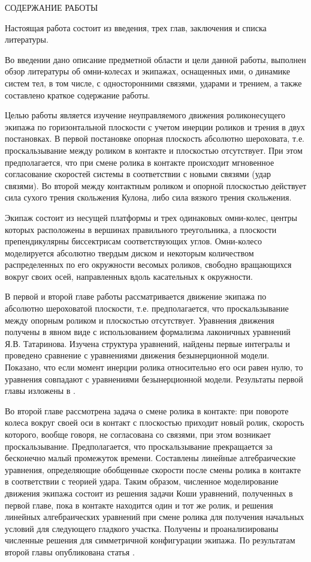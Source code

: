 
СОДЕРЖАНИЕ РАБОТЫ

Настоящая работа состоит из введения, трех глав, заключения и списка литературы.

Во введении дано описание предметной области и цели данной работы, выполнен обзор литературы об омни-колесах и экипажах, оснащенных ими, о динамике систем тел, в том числе, с односторонними связями, ударами и трением, а также составлено краткое содержание работы.

Целью работы является изучение неуправляемого движения роликонесущего экипажа по горизонтальной плоскости с учетом инерции роликов и трения в двух постановках. В первой постановке опорная плоскость абсолютно шероховата, т.е. проскальзывание между роликом в контакте и плоскостью отсутствует. При этом предполагается, что при смене ролика в контакте происходит мгновенное согласование скоростей системы в соответствии с новыми связями (удар связями). Во второй между контактным роликом и опорной плоскостью действует сила сухого трения скольжения Кулона, либо сила вязкого трения скольжения. 

Экипаж состоит из несущей платформы и трех одинаковых омни-колес, центры которых расположены в вершинах правильного треугольника, а плоскости препендикулярны биссектрисам соответствующих углов. Омни-колесо моделируется абсолютно твердым диском и некоторым количеством распределенных по его окружности весомых роликов, свободно вращающихся вокруг своих осей, направленных вдоль касательных к окружности.

В первой и второй главе работы рассматривается движение  экипажа по абсолютно  шероховатой плоскости, т.е. предполагается, что проскальзывание между опорным роликом и плоскостью отсутствует. Уравнения движения получены в явном виде с использованием формализма лаконичных уравнений Я.В. Татаринова. Изучена структура уравнений, найдены первые интегралы и проведено сравнение с уравнениями движения безынерционной модели. Показано, что если момент инерции ролика относительно его оси равен нулю, то уравнения совпадают с уравнениями безынерционной модели. Результаты первой главы изложены в \cite{GerasimovZobovaPMM2018}.

Во второй главе рассмотрена задача о смене ролика в контакте: при повороте колеса вокруг своей оси в контакт с плоскостью приходит новый ролик, скорость которого, вообще говоря, не согласована со связями, при этом возникает проскальзывание. Предполагается, что проскальзывание прекращается за бесконечно малый промежуток времени. Составлены линейные алгебраические уравнения, определяющие обобщенные скорости после смены ролика в контакте в соответствии с теорией удара. Таким образом, численное моделирование движения экипажа состоит из решения задачи Коши уравнений, полученных в первой главе, пока в контакте находится один и тот же ролик, и решения линейных алгебраических уравнений при смене ролика для получения начальных условий для следующего гладкого участка. Получены и проанализированы численные решения для симметричной конфигурации экипажа. По результатам второй главы опубликована статья  \cite{GerasimovZobovaTrudyMAI2018}.

